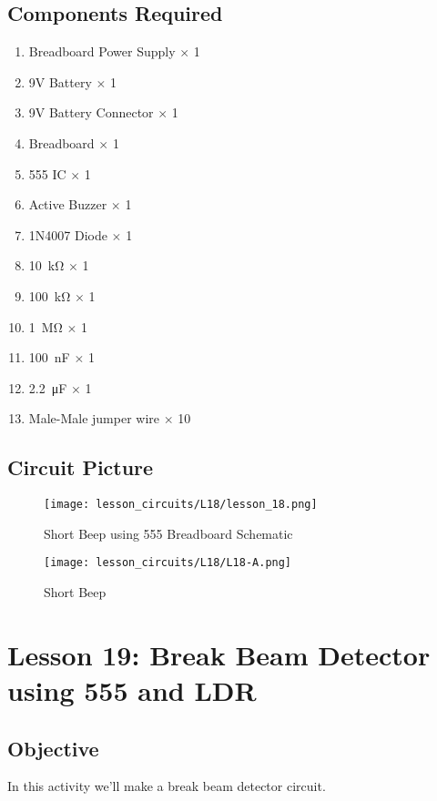 \subsection{Components Required}
\begin{enumerate}
    \item Breadboard Power Supply $\times$ 1
    \item 9V Battery $\times$ 1
    \item 9V Battery Connector $\times$ 1
    \item Breadboard $\times$ 1
    \item 555 IC $\times$ 1
    \item Active Buzzer $\times$ 1
    \item 1N4007 Diode $\times$ 1
    \item \SI{10}{\kilo\ohm} $\times$ 1
    \item \SI{100}{\kilo\ohm} $\times$ 1
    \item \SI{1}{\Mohm} $\times$ 1
    \item \SI{100}{\nano\farad} $\times$ 1
    \item \SI{2.2}{\micro\farad} $\times$ 1
    \item Male-Male jumper wire $\times$ 10
\end{enumerate}
\subsection{Circuit Picture}
\begin{figure}[!hp]
    \centering
    \texttt{[image: lesson\_circuits/L18/lesson\_18.png]}
    \caption{Short Beep using 555 Breadboard Schematic}
    \label{fig:555_sbeep_sch}
\end{figure}
\begin{figure}[!hp]
    \centering
    \texttt{[image: lesson\_circuits/L18/L18-A.png]}
    \caption{Short Beep}
    \label{fig:555_sbeep_obb}
\end{figure}
\section{Lesson 19: Break Beam Detector using 555 and LDR}
\subsection{Objective}
In this activity we'll make a break beam detector circuit.

